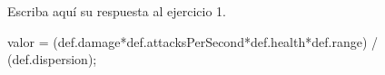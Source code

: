 Escriba aquí su respuesta al ejercicio 1.

valor = (def.damage*def.attacksPerSecond*def.health*def.range) / (def.dispersion);